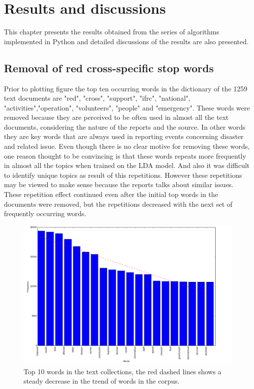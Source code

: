 \chapter{Results and discussions}
This chapter presents the results obtained from the series of algorithms implemented in Python and detailed discussions of the results are also presented. 
\section{Removal of red cross-specific stop words}
Prior to plotting figure \text{\eqref{Fig. 4.1}} the top ten occurring words in the dictionary of the 1259 text documents are "red", "cross",  "support", "ifrc", "national", "activities","operation", "volunteers", "people" and "emergency". These words were removed because they are perceived  to be often used in almost all the text documents, considering the nature of the reports and the source. In other words they are key words that are always used in reporting events concerning disaster and  related issue. Even though there is no clear motive for removing these words, one reason thought to be convincing is that these words repeats more frequently in almost all the topics when trained on the LDA model. And also it was difficult to identify unique topics as result of this repetitions. However these repetitions may be viewed to make sense because the reports talks about similar issues. These repetition effect continued even after the initial top words in the documents were removed, but the repetitions decreased with the next set of frequently occurring words.
\begin{figure}[hbtp]
\centering
\includegraphics[scale=0.35]{c4_1_orig.png}
\caption{Top 10 words  in the text collections, the red dashed lines shows a steady decrease in the trend of words in the corpus.}\label{Fig. 4.1}
\end{figure}
 
